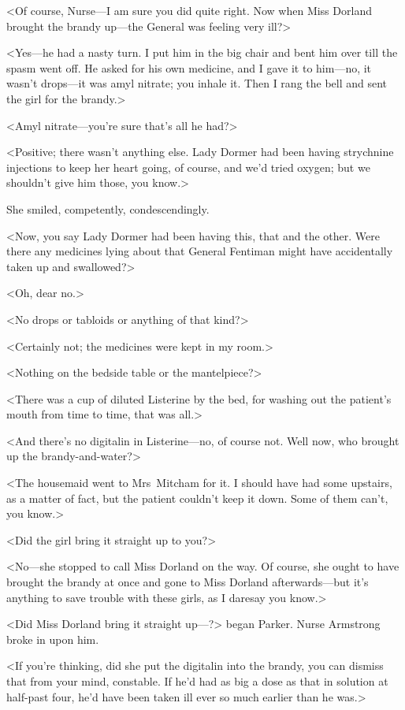 <Of course, Nurse—I am sure you did quite right. Now when Miss Dorland brought the brandy up—the General was feeling very ill?>

<Yes—he had a nasty turn. I put him in the big chair and bent him over till the spasm went off. He asked for his own medicine, and I gave it to him—no, it wasn't drops—it was amyl nitrate; you inhale it. Then I rang the bell and sent the girl for the brandy.>

<Amyl nitrate—you're sure that's all he had?>

<Positive; there wasn't anything else. Lady Dormer had been having strychnine injections to keep her heart going, of course, and we'd tried oxygen; but we shouldn't give him those, you know.>

She smiled, competently, condescendingly.

<Now, you say Lady Dormer had been having this, that and the other. Were there any medicines lying about that General Fentiman might have accidentally taken up and swallowed?>

<Oh, dear no.>

<No drops or tabloids or anything of that kind?>

<Certainly not; the medicines were kept in my room.>

<Nothing on the bedside table or the mantelpiece?>

<There was a cup of diluted Listerine by the bed, for washing out the patient's mouth from time to time, that was all.>

<And there's no digitalin in Listerine—no, of course not. Well now, who brought up the brandy-and-water?>

<The housemaid went to Mrs~Mitcham for it. I should have had some upstairs, as a matter of fact, but the patient couldn't keep it down. Some of them can't, you know.>

<Did the girl bring it straight up to you?>

<No—she stopped to call Miss Dorland on the way. Of course, she ought to have brought the brandy at once and gone to Miss Dorland afterwards—but it's anything to save trouble with these girls, as I daresay you know.>

<Did Miss Dorland bring it straight up—?> began Parker. Nurse Armstrong broke in upon him.

<If you're thinking, did she put the digitalin into the brandy, you can dismiss that from your mind, constable. If he'd had as big a dose as that in solution at half-past four, he'd have been taken ill ever so much earlier than he was.>

